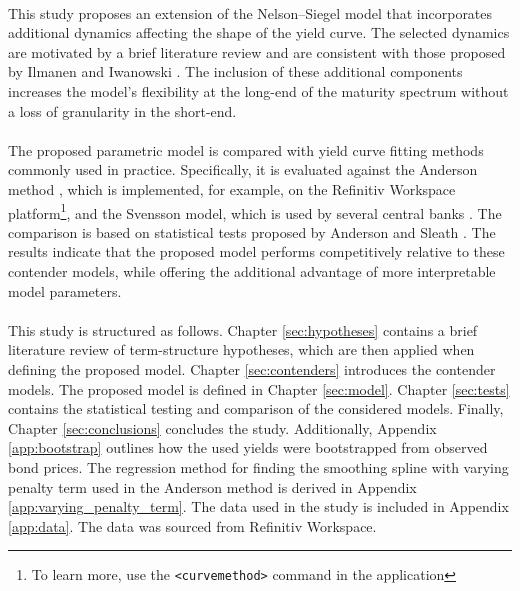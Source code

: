 \documentclass[a4paper]{artikel3}
\numberwithin{equation}{section}
\numberwithin{theorem}{section}
\numberwithin{proposition}{section}
\numberwithin{lemma}{section}
\begin{document}
\\
This study proposes an extension of the Nelson–Siegel model that incorporates additional dynamics affecting the shape of the yield curve. The selected dynamics are motivated by a brief literature review and are consistent with those proposed by Ilmanen and Iwanowski \cite{ilmanen_iwanowski_1997}. The inclusion of these additional components increases the model’s flexibility at the long-end of the maturity spectrum without a loss of granularity in the short-end. \\
\\
The proposed parametric model is compared with yield curve fitting methods commonly used in practice. Specifically, it is evaluated against the Anderson method \cite{anderson_sleath_1999}, which is implemented, for example, on the Refinitiv Workspace platform\footnote{To learn more, use the \texttt{<curvemethod>} command in the application}, and the Svensson model, which is used by several central banks \cite{bis_2005}. The comparison is based on statistical tests proposed by Anderson and Sleath \cite{anderson_sleath_1999}. The results indicate that the proposed model performs competitively relative to these contender models, while offering the additional advantage of more interpretable model parameters. \\
\\
This study is structured as follows. Chapter \ref{sec:hypotheses} contains a brief literature review of term-structure hypotheses, which are then applied when defining the proposed model. Chapter \ref{sec:contenders} introduces the contender models. The proposed model is defined in Chapter \ref{sec:model}. Chapter \ref{sec:tests} contains the statistical testing and comparison of the considered models. Finally, Chapter \ref{sec:conclusions} concludes the study. Additionally, Appendix \ref{app:bootstrap} outlines how the used yields were bootstrapped from observed bond prices. The regression method for finding the smoothing spline with varying penalty term used in the Anderson method is derived in Appendix \ref{app:varying_penalty_term}. The data used in the study is included in Appendix \ref{app:data}. The data was sourced from Refinitiv Workspace.



\clearpage
\end{document}
